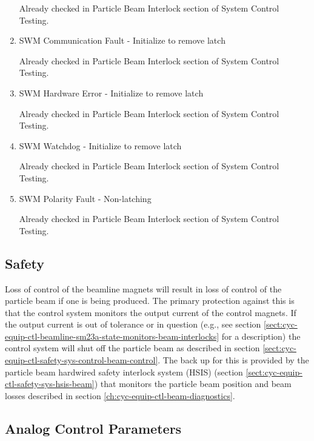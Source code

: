 \documentclass[11pt]{book}		%
\begin{document}
\begin{enumerate}
\color{red}
Already checked in Particle Beam Interlock section of System Control Testing.
\color{black}

 \item SWM Communication Fault - Initialize to remove latch

\color{red}
Already checked in Particle Beam Interlock section of System Control Testing.
\color{black}

 \item SWM Hardware Error - Initialize to remove latch

\color{red}
Already checked in Particle Beam Interlock section of System Control Testing.
\color{black}

 \item SWM Watchdog - Initialize to remove latch

\color{red}
Already checked in Particle Beam Interlock section of System Control Testing.
\color{black}

 \item SWM Polarity Fault - Non-latching

\color{red}
Already checked in Particle Beam Interlock section of System Control Testing.
\color{black}

\end{enumerate}


\subsection{Safety}

Loss of control of the beamline magnets will result in loss of control of the particle beam if one is being produced.  The primary protection against this is that the control system monitors the output current of the control magnets.  If the output current is out of tolerance or in question (e.g., see section \ref{sect:cyc-equip-ctl-beamline-sm23a-state-monitors-beam-interlocks} for a description) the control system will shut off the particle beam as described in section \ref{sect:cyc-equip-ctl-safety-sys-control-beam-control}.  The back up for this is provided by the particle beam hardwired safety interlock system (HSIS) (section \ref{sect:cyc-equip-ctl-safety-sys-hsis-beam}) that monitors the particle beam position and beam losses described in section \ref{ch:cyc-equip-ctl-beam-diagnostics}.


\subsection{Analog Control Parameters}
\end{document}
